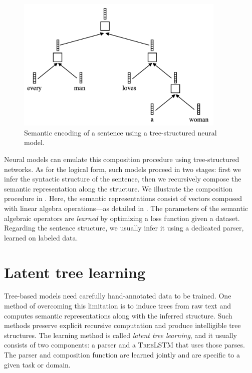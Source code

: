 \begin{figure}[h!]
	\includegraphics[width=10cm]{images/tree_rnn.png}
	\caption[Tree LSTM]{Semantic encoding of a sentence using a tree-structured neural model.}
\end{figure}

Neural models can emulate this composition procedure using tree-structured networks. As for the logical form, such models proceed in two stages: first we infer the syntactic structure of the sentence, then we recursively compose the semantic representation along the structure. We illustrate the composition procedure in . Here, the semantic representations consist of vectors composed with linear algebra operations—as detailed in . The parameters of the semantic algebraic operators are \textit{learned} by optimizing a loss function given a dataset. Regarding the sentence structure, we usually infer it using a dedicated parser, learned on labeled data.


\section{Latent tree learning}

Tree-based models need carefully hand-annotated data to be trained. One method of overcoming this limitation is to induce trees from raw text and computes semantic representations along with the inferred structure. Such methods preserve explicit recursive computation and produce intelligible tree structures. The learning method is called \textit{latent tree learning}, and it usually consists of two components: a parser and a \textsc{TreeLSTM} that uses those parses. The parser and composition function are learned jointly and are specific to a given task or domain. 

